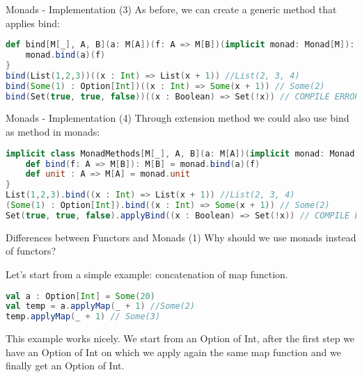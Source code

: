 \begin{frame}[fragile]{Monads - Implementation (3)}		
	As before, we can create a generic method that applies bind:
\begin{lstlisting}[language=scala]
def bind[M[_], A, B](a: M[A])(f: A => M[B])(implicit monad: Monad[M]): M[B] = {
	monad.bind(a)(f)
}
bind(List(1,2,3))((x : Int) => List(x + 1)) //List(2, 3, 4)
bind(Some(1) : Option[Int])((x : Int) => Some(x + 1)) // Some(2)
bind(Set(true, true, false))((x : Boolean) => Set(!x)) // COMPILE ERROR
\end{lstlisting}	
\end{frame}

\begin{frame}[fragile]{Monads - Implementation (4)}	
	Through extension method we could also use bind as method in monads:
\begin{lstlisting}[language=scala]
implicit class MonadMethods[M[_], A, B](a: M[A])(implicit monad: Monad[M]) {
	def bind(f: A => M[B]): M[B] = monad.bind(a)(f)
	def unit : A => M[A] = monad.unit
}
List(1,2,3).bind((x : Int) => List(x + 1)) //List(2, 3, 4)
(Some(1) : Option[Int]).bind((x : Int) => Some(x + 1)) // Some(2)
Set(true, true, false).applyBind((x : Boolean) => Set(!x)) // COMPILE ERROR	
\end{lstlisting}	
\end{frame}

\begin{frame}[fragile]{Differences between Functors and Monads (1)}
	Why should we use monads instead of functors?
	
	Let's start from a simple example: concatenation of map function.
\begin{lstlisting}[language=scala]
val a : Option[Int] = Some(20)
val temp = a.applyMap(_ + 1) //Some(2)
temp.applyMap(_ + 1) // Some(3)
\end{lstlisting}				
	This example works nicely. We start from an Option of Int, after the first step we have an Option of Int on which we apply again 
	the same map function and we finally get an Option of Int.
\end{frame}

